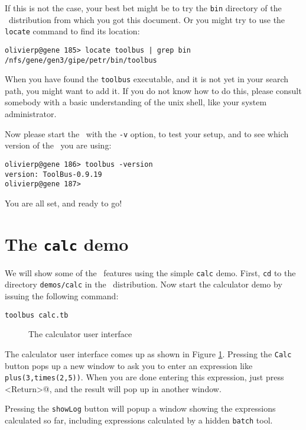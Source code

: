 If this is not the case, your best bet might be to try the {\tt bin}
directory of the \TB\ distribution from which you got this document.
Or you might try to use the {\tt locate} command
to find its location:
\begin{verbatim}
olivierp@gene 185> locate toolbus | grep bin
/nfs/gene/gen3/gipe/petr/bin/toolbus
\end{verbatim}

When you have found the {\tt toolbus} executable, and it is not yet
in your search path, you might want to add it. If you do not know how
to do this, please consult somebody with a basic understanding of the
unix shell, like your system administrator.

Now please start the \TB\ with the {\tt -v} option, to test your setup,
and to see which version of the \TB\ you are using:

\begin{verbatim}
olivierp@gene 186> toolbus -version
version: ToolBus-0.9.19
olivierp@gene 187>
\end{verbatim}

You are all set, and ready to go!

\section{The {\tt calc} demo}

We will show some of the \TB\ features using the simple {\tt calc} demo.
First, {\tt cd} to the directory {\tt demos/calc} in the \TB\ distribution.
Now start the calculator demo by issuing the following command:

\begin{verbatim}
toolbus calc.tb
\end{verbatim}

\begin{figure}[htb]
\centerline{}
\caption{The calculator user interface}
\label{calc-ui}
\end{figure}

The calculator user interface comes up as shown in Figure \ref{calc-ui}.
Pressing the {\tt Calc} button pops up a new window to ask you to enter
an expression like {\tt plus(3,times(2,5))}.
When you are done entering this expression, just press 
\verb@<Return>@, and the result will pop up in another window.

Pressing the {\tt showLog} button will popup a window showing the
expressions calculated so far, including expressions calculated
by a hidden {\tt batch} tool.



